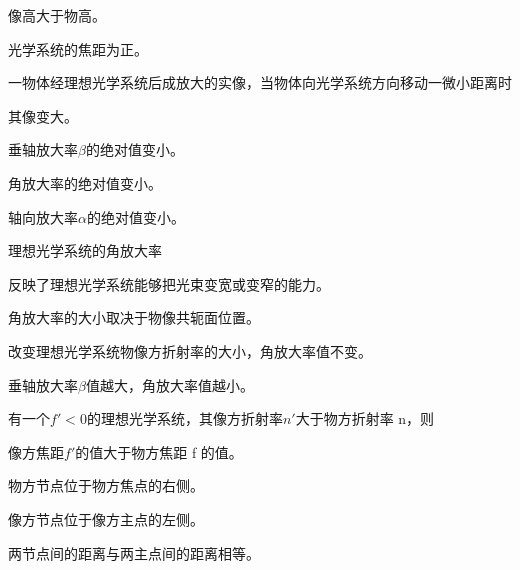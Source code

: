 \documentclass[standard, analysis, notocnum]{ExBook}
\newcommand{\answerarea}[1][8cm]{%
  \par\vspace{2mm}%
  \noindent{\color{themeColor!35}\rule{\linewidth}{0.4pt}}\par
  \noindent\begin{minipage}[t][#1][t]{\linewidth}\vspace{0pt}\end{minipage}\par
  \noindent{\color{themeColor!35}\rule{\linewidth}{0.4pt}}\par
}
\begin{document}
\begin{qitems}
\begin{bbox}
\par\noindent\hspace{2em}像高大于物高。
\par\noindent\hspace{2em}光学系统的焦距为正。
\answerarea[3.5cm]
\end{bbox}
\begin{bbox}
\qitem 一物体经理想光学系统后成放大的实像，当物体向光学系统方向移动一微小距离时
\par\noindent\hspace{2em}其像变大。
\par\noindent\hspace{2em}垂轴放大率$\beta$的绝对值变小。
\par\noindent\hspace{2em}角放大率的绝对值变小。
\par\noindent\hspace{2em}轴向放大率$\alpha$的绝对值变小。
\answerarea[3.5cm]
\end{bbox}
\begin{bbox}
\qitem 理想光学系统的角放大率
\par\noindent\hspace{2em}反映了理想光学系统能够把光束变宽或变窄的能力。
\par\noindent\hspace{2em}角放大率的大小取决于物像共轭面位置。
\par\noindent\hspace{2em}改变理想光学系统物像方折射率的大小，角放大率值不变。
\par\noindent\hspace{2em}垂轴放大率$\beta$值越大，角放大率值越小。
\answerarea[3.5cm]
\end{bbox}
\begin{bbox}
\qitem 有一个$f'<0$的理想光学系统，其像方折射率$n'$大于物方折射率 n，则
\par\noindent\hspace{2em}像方焦距$f'$的值大于物方焦距 f 的值。
\par\noindent\hspace{2em}物方节点位于物方焦点的右侧。
\par\noindent\hspace{2em}像方节点位于像方主点的左侧。
\par\noindent\hspace{2em}两节点间的距离与两主点间的距离相等。

\end{bbox}
\end{qitems}
\end{document}
